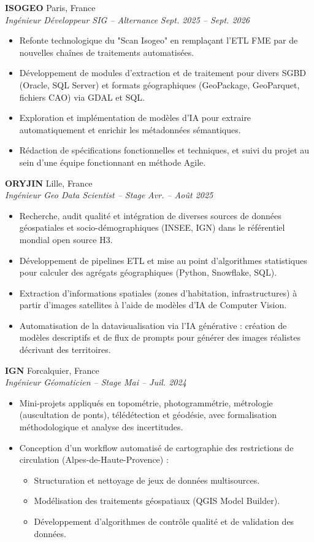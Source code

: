 \documentclass[11pt, a4paper]{article}
\newcommand{\cventry}[4]{
    \vspace{0.1cm}
    \noindent \textbf{#1} \hfill #2 \\
    \noindent \textit{#3} \hfill \textit{#4} \par
    \vspace{0.05cm}
}
\begin{document}
\cventry{ISOGEO}{Paris, France}{Ingénieur Développeur SIG -- Alternance}{Sept. 2025 -- Sept. 2026}
\begin{itemize}[leftmargin=0.5cm, nosep]
    \item Refonte technologique du "Scan Isogeo" en remplaçant l'ETL FME par de nouvelles chaînes de traitements automatisées.
    \item Développement de modules d'extraction et de traitement pour divers SGBD (Oracle, SQL Server) et formats géographiques (GeoPackage, GeoParquet, fichiers CAO) via GDAL et SQL.
    \item Exploration et implémentation de modèles d'IA pour extraire automatiquement et enrichir les métadonnées sémantiques.
    \item Rédaction de spécifications fonctionnelles et techniques, et suivi du projet au sein d'une équipe fonctionnant en méthode Agile.
\end{itemize}

\cventry{ORYJIN}{Lille, France}{Ingénieur Geo Data Scientist -- Stage}{Avr. -- Août 2025}
\begin{itemize}[leftmargin=0.5cm, nosep]
    \item Recherche, audit qualité et intégration de diverses sources de données géospatiales et socio-démographiques (INSEE, IGN) dans le référentiel mondial open source H3.
    \item Développement de pipelines ETL et mise au point d'algorithmes statistiques pour calculer des agrégats géographiques (Python, Snowflake, SQL).
    \item Extraction d'informations spatiales (zones d'habitation, infrastructures) à partir d'images satellites à l'aide de modèles d'IA de Computer Vision.
    \item Automatisation de la datavisualisation via l'IA générative : création de modèles descriptifs et de flux de prompts pour générer des images réalistes décrivant des territoires.
\end{itemize}

\cventry{IGN}{Forcalquier, France}{Ingénieur Géomaticien -- Stage}{Mai -- Juil. 2024}
\begin{itemize}[leftmargin=0.5cm, nosep]
    \item Mini-projets appliqués en topométrie, photogrammétrie, métrologie (auscultation de ponts), télédétection et géodésie, avec formalisation méthodologique et analyse des incertitudes.
    \item Conception d’un workflow automatisé de cartographie des restrictions de circulation (Alpes-de-Haute-Provence) :
    \begin{itemize}[leftmargin=0.5cm, nosep]
        \item Structuration et nettoyage de jeux de données multisources.
        \item Modélisation des traitements géospatiaux (QGIS Model Builder).
        \item Développement d’algorithmes de contrôle qualité et de validation des données.
    \end{itemize}
\end{itemize}
\end{document}

